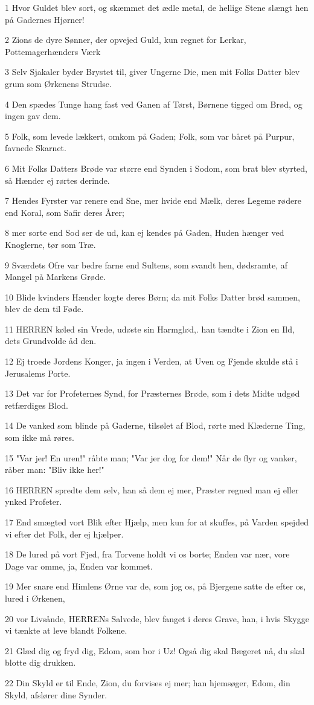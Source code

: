 \par 1 Hvor Guldet blev sort, og skæmmet det ædle metal, de hellige Stene slængt hen på Gadernes Hjørner!
\par 2 Zions de dyre Sønner, der opvejed Guld, kun regnet for Lerkar, Pottemagerhænders Værk
\par 3 Selv Sjakaler byder Brystet til, giver Ungerne Die, men mit Folks Datter blev grum som Ørkenens Strudse.
\par 4 Den spædes Tunge hang fast ved Ganen af Tørst, Børnene tigged om Brød, og ingen gav dem.
\par 5 Folk, som levede lækkert, omkom på Gaden; Folk, som var båret på Purpur, favnede Skarnet.
\par 6 Mit Folks Datters Brøde var større end Synden i Sodom, som brat blev styrted, så Hænder ej rørtes derinde.
\par 7 Hendes Fyrster var renere end Sne, mer hvide end Mælk, deres Legeme rødere end Koral, som Safir deres Årer;
\par 8 mer sorte end Sod ser de ud, kan ej kendes på Gaden, Huden hænger ved Knoglerne, tør som Træ.
\par 9 Sværdets Ofre var bedre farne end Sultens, som svandt hen, dødsramte, af Mangel på Markens Grøde.
\par 10 Blide kvinders Hænder kogte deres Børn; da mit Folks Datter brød sammen, blev de dem til Føde.
\par 11 HERREN køled sin Vrede, udøste sin Harmglød,. han tændte i Zion en Ild, dets Grundvolde åd den.
\par 12 Ej troede Jordens Konger, ja ingen i Verden, at Uven og Fjende skulde stå i Jerusalems Porte.
\par 13 Det var for Profeternes Synd, for Præsternes Brøde, som i dets Midte udgød retfærdiges Blod.
\par 14 De vanked som blinde på Gaderne, tilsølet af Blod, rørte med Klæderne Ting, som ikke må røres.
\par 15 "Var jer! En uren!" råbte man; "Var jer dog for dem!" Når de flyr og vanker, råber man: "Bliv ikke her!"
\par 16 HERREN spredte dem selv, han så dem ej mer, Præster regned man ej eller ynked Profeter.
\par 17 End smægted vort Blik efter Hjælp, men kun for at skuffes, på Varden spejded vi efter det Folk, der ej hjælper.
\par 18 De lured på vort Fjed, fra Torvene holdt vi os borte; Enden var nær, vore Dage var omme, ja, Enden var kommet.
\par 19 Mer snare end Himlens Ørne var de, som jog os, på Bjergene satte de efter os, lured i Ørkenen,
\par 20 vor Livsånde, HERRENs Salvede, blev fanget i deres Grave, han, i hvis Skygge vi tænkte at leve blandt Folkene.
\par 21 Glæd dig og fryd dig, Edom, som bor i Uz! Også dig skal Bægeret nå, du skal blotte dig drukken.
\par 22 Din Skyld er til Ende, Zion, du forvises ej mer; han hjemsøger, Edom, din Skyld, afslører dine Synder.

